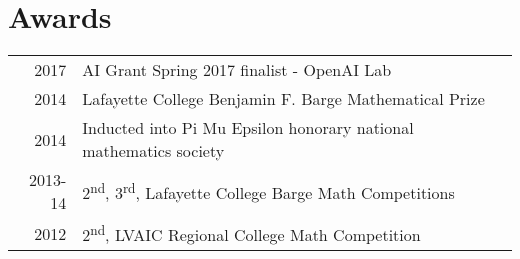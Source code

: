 \documentclass{deedy-resume-openfont}
\begin{document}
\begin{minipage}[t]{0.66\textwidth}
\section{Awards}
\begin{tabular}{rll}
2017	     & AI Grant Spring 2017 finalist - OpenAI Lab\\
2014	     & Lafayette College Benjamin F. Barge Mathematical Prize\\
2014         & Inducted into Pi Mu Epsilon honorary national mathematics society\\
2013-14	     & 2\textsuperscript{nd}, 3\textsuperscript{rd}, Lafayette College Barge Math Competitions\\
2012	     & 2\textsuperscript{nd}, LVAIC Regional College Math Competition\\
\end{tabular}
\sectionsep


\renewcommand\refname{\vskip -1.5cm} %


\nocite{*}

\end{minipage}
\end{document}
